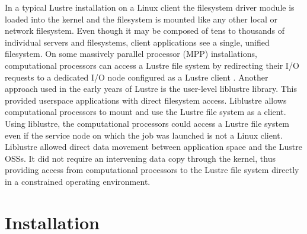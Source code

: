 \documentclass[9pt,twocolumn,twoside]{styles/osajnl}
\begin{document}
In a typical Lustre installation on a Linux client the filesystem
driver module is loaded into the kernel and the filesystem is mounted
like any other local or network filesystem. Even though it may be
composed of tens to thousands of individual servers and filesystems,
client applications see a single, unified filesystem. On some
massively parallel processor (MPP) installations, computational
processors can access a Lustre file system by redirecting their I/O
requests to a dedicated I/O node configured as a Lustre client
\cite{www-bluegene-wikipedia}. Another approach used in the early
years of Lustre is the user-level liblustre library. This provided
userspace applications with direct filesystem access. Liblustre allows
computational processors to mount and use the Lustre file system as a
client. Using liblustre, the computational processors could access a
Lustre file system even if the service node on which the job was
launched is not a Linux client. Liblustre allowed direct data movement
between application space and the Lustre OSSs. It did not require an
intervening data copy through the kernel, thus providing access from
computational processors to the Lustre file system directly in a
constrained operating environment.

\section{Installation}
\end{document}
